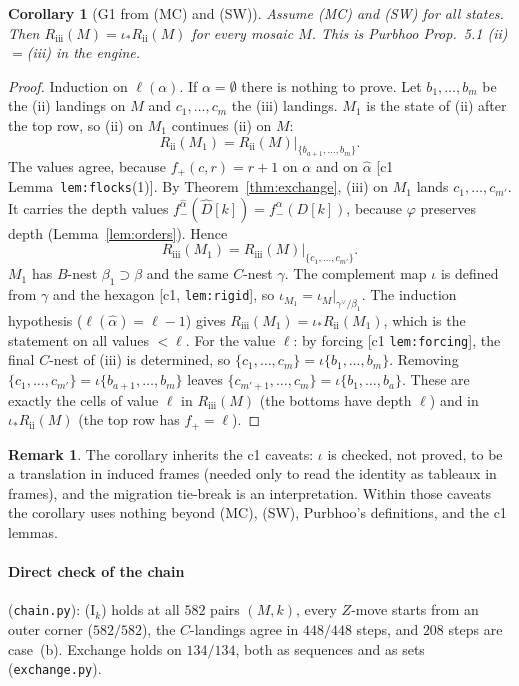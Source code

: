 \documentclass[11pt]{article}
\newtheorem{corollary}[theorem]{Corollary}
\theoremstyle{definition}
\newtheorem{remark}[theorem]{Remark}
\newcommand{\Rii}{R_{\mathrm{ii}}}
\newcommand{\Riii}{R_{\mathrm{iii}}}
\begin{document}
\begin{corollary}[G1 from (MC) and (SW)]\label{cor:G1}
Assume (MC) and (SW) for all states. Then $\Riii(M)=\iota_*\Rii(M)$ for every mosaic $M$. This is Purbhoo Prop.~5.1 (ii)$=$(iii)
in the engine.
\end{corollary}
\begin{proof}
Induction on $\ell(\alpha)$. If $\alpha=\emptyset$ there is nothing to prove. Let $b_1,\dots,b_m$ be the (ii) landings on $M$ and
$c_1,\dots,c_m$ the (iii) landings. $M_1$ is the state of (ii) after the top row, so (ii) on $M_1$ continues (ii) on $M$:
\[\Rii(M_1)=\Rii(M)|_{\{b_{a+1},\dots,b_m\}}.\]
The values agree, because $f_+(c,r)=r+1$ on $\alpha$ and on $\hat\alpha$ [c1 Lemma~\texttt{lem:flocks}(1)]. By
Theorem~\ref{thm:exchange}, (iii) on $M_1$ lands $c_1,\dots,c_{m'}$. It carries the depth values $f_-^{\hat\alpha}(\hat
D[k])=f_-^{\alpha}(D[k])$, because $\varphi$ preserves depth (Lemma~\ref{lem:orders}). Hence
\[\Riii(M_1)=\Riii(M)|_{\{c_1,\dots,c_{m'}\}}.\]
$M_1$ has $B$-nest $\beta_1\supset\beta$ and the same $C$-nest $\gamma$. The complement map $\iota$ is defined from $\gamma$ and
the hexagon [c1, \texttt{lem:rigid}], so $\iota_{M_1}=\iota_M|_{\gamma^\vee/\beta_1}$. The induction hypothesis
($\ell(\hat\alpha)=\ell-1$) gives $\Riii(M_1)=\iota_*\Rii(M_1)$, which is the statement on all values $<\ell$. For the value $\ell$:
by forcing [c1 \texttt{lem:forcing}], the final $C$-nest of (iii) is determined, so $\{c_1,\dots,c_m\}=\iota\{b_1,\dots,b_m\}$.
Removing $\{c_1,\dots,c_{m'}\}=\iota\{b_{a+1},\dots,b_m\}$ leaves $\{c_{m'+1},\dots,c_m\}=\iota\{b_1,\dots,b_a\}$. These are
exactly the cells of value $\ell$ in $\Riii(M)$ (the bottoms have depth $\ell$) and in $\iota_*\Rii(M)$ (the top row has $f_+=\ell$).
\end{proof}

\begin{remark}
The corollary inherits the c1 caveats: $\iota$ is checked, not proved, to be a translation in induced frames (needed only
to read the identity as tableaux in frames), and the migration tie-break is an interpretation. Within those caveats the
corollary uses nothing beyond (MC), (SW), Purbhoo's definitions, and the c1 lemmas.
\end{remark}

\paragraph{Direct check of the chain} (\texttt{chain.py}): (I$_k$) holds at all $582$ pairs $(M,k)$, every $Z$-move starts from an outer
corner ($582/582$), the $C$-landings agree in $448/448$ steps, and $208$ steps are case~(b). Exchange holds on $134/134$, both as
sequences and as sets (\texttt{exchange.py}).
\end{document}
